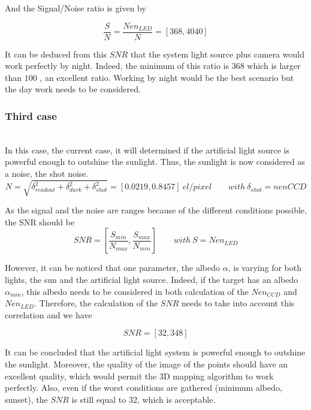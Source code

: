 And the Signal/Noise ratio is given by

\begin{equation}
\label{eq:Signal Noise Ratio case2}
\frac{S}{N} = \frac{Nen_{LED}}{N} = [368, 4040]
\end{equation}

It can be deduced from this $SNR$ that the system light source plus camera would work perfectly by night. Indeed, the minimum of this ratio is $368$ which is larger than $100$
, an excellent ratio. Working by night would be the best scenario but the day work needs to be considered.


\subsubsection{Third case} \label{thirdcase}
~\\
In this case, the current case, it will determined if the artificial light source is powerful enough to outshine the sunlight. Thus, the sunlight is now considered as a noise, the shot noise. 
\begin{equation}
\label{eq:Noise case3}
N = \sqrt{\delta_{readout}^2+\delta_{dark}^2+\delta_{shot}^2} = [0.0219, 0.8457]\ el/pixel \qquad with\ \delta_{shot} = nenCCD
\end{equation}


As the signal and the noise are ranges because of the different conditions possible, the SNR should be 
\begin{equation*}
SNR = \left[\frac{S_{min}}{N_{max}}, \frac{S_{max}}{N_{min}}\right] \qquad with\ S=Nen_{LED}
\end{equation*}

However, it can be noticed that one parameter, the albedo $\alpha$, is varying for both lights, the sun and the artificial light source. Indeed, if the target has an albedo $\alpha_{min}$, this albedo needs to be considered in both calculation of the $Nen_{CCD}$ and $Nen_{LED}$. Therefore, the calculation of the $SNR$ needs to take into account this correlation and we have

\begin{equation}
SNR = [32, 348]
\end{equation}

It can be concluded that the artificial light system is powerful enough to outshine the sunlight. Moreover, the quality of the image of the points should have an excellent quality, which would permit the 3D mapping algorithm to work perfectly. Also, even if the worst conditions are gathered (minimum albedo, sunset), the $SNR$ is still equal to 32, which is acceptable.


